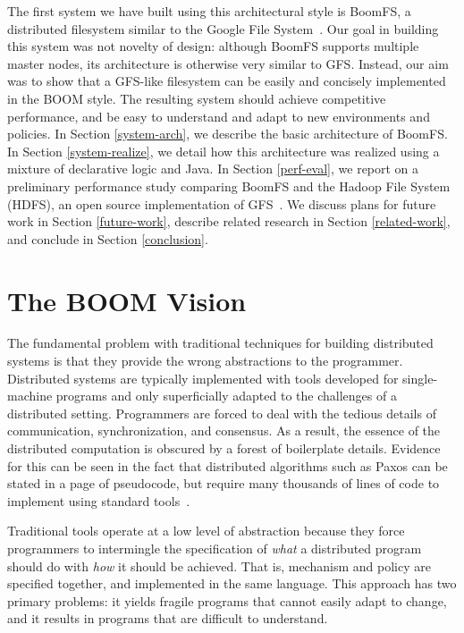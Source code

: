 \documentclass[twocolumn]{article}
\begin{document}
The first system we have built using this architectural style is
BoomFS, a distributed filesystem similar to the Google File
System~\cite{gfs}. Our goal in building this system was not novelty of
design: although BoomFS supports multiple master nodes, its
architecture is otherwise very similar to GFS. Instead, our aim was to
show that a GFS-like filesystem can be easily and concisely
implemented in the BOOM style. The resulting system should achieve
competitive performance, and be easy to understand and adapt to new
environments and policies. In Section \ref{system-arch}, we describe
the basic architecture of BoomFS. In Section \ref{system-realize}, we
detail how this architecture was realized using a mixture of
declarative logic and Java. In Section \ref{perf-eval}, we report on a
preliminary performance study comparing BoomFS and the Hadoop File
System (HDFS), an open source implementation of
GFS~\cite{hdfs-arch}. We discuss plans for future work in Section
\ref{future-work}, describe related research in Section
\ref{related-work}, and conclude in Section \ref{conclusion}.

\section{The BOOM Vision}
\label{boom-vision}
The fundamental problem with traditional techniques for building
distributed systems is that they provide the wrong abstractions to the
programmer. Distributed systems are typically implemented with tools
developed for single-machine programs and only superficially adapted
to the challenges of a distributed setting. Programmers are forced to
deal with the tedious details of communication, synchronization, and
consensus. As a result, the essence of the distributed computation is
obscured by a forest of boilerplate details. Evidence for this can be
seen in the fact that distributed algorithms such as Paxos can be
stated in a page of pseudocode, but require many thousands of lines of
code to implement using standard tools~\cite{paxos-made-live}.

Traditional tools operate at a low level of abstraction because they
force programmers to intermingle the specification of \emph{what} a
distributed program should do with \emph{how} it should be
achieved. That is, mechanism and policy are specified together, and
implemented in the same language. This approach has two primary
problems: it yields fragile programs that cannot easily adapt to
change, and it results in programs that are difficult to understand.
\end{document}
